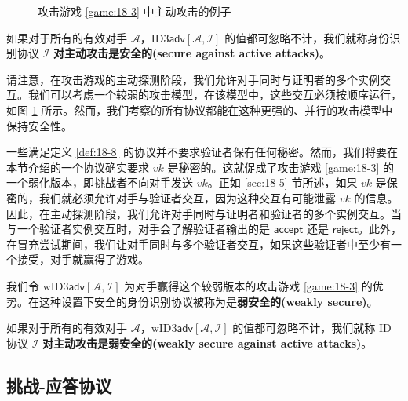 \begin{figure}
  \centering
  
  \caption{攻击游戏 \ref{game:18-3} 中主动攻击的例子}
  \label{fig:18-10}
\end{figure}

\begin{definition}\label{def:18-8}
如果对于所有的有效对手 $\mathcal{A}$，$\mathrm{ID3}\mathsf{adv}[\mathcal{A}, \mathcal{I}]$ 的值都可忽略不计，我们就称身份识别协议 $\mathcal{I}$ \textbf{对主动攻击是安全的(secure against active attacks)}。
\end{definition}

\begin{snote}
请注意，在攻击游戏的主动探测阶段，我们允许对手同时与证明者的多个实例交互。我们可以考虑一个较弱的攻击模型，在该模型中，这些交互必须按顺序运行，如图 \ref{fig:18-10} 所示。然而，我们考察的所有协议都能在这种更强的、并行的攻击模型中保持安全性。
\end{snote}

\begin{snote}[保持 $vk$ 的机密性。]
一些满足定义 \ref{def:18-8} 的协议并不要求验证者保有任何秘密。然而，我们将要在本节介绍的一个协议确实要求 $vk$ 是秘密的。这就促成了攻击游戏 \ref{game:18-3} 的一个弱化版本，即挑战者不向对手发送 $vk$。正如 \ref{sec:18-5} 节所述，如果 $vk$ 是保密的，我们就必须允许对手与验证者交互，因为这种交互有可能泄露 $vk$ 的信息。因此，在主动探测阶段，我们允许对手同时与证明者和验证者的多个实例交互。当与一个验证者实例交互时，对手会了解验证者输出的是 $\mathsf{accept}$ 还是 $\mathsf{reject}$。此外，在冒充尝试期间，我们让对手同时与多个验证者交互，如果这些验证者中至少有一个接受，对手就赢得了游戏。

我们令 $\mathrm{wID3}\mathsf{adv}[\mathcal{A},\mathcal{I}]$ 为对手赢得这个较弱版本的攻击游戏 \ref{game:18-3} 的优势。在这种设置下安全的身份识别协议被称为是\textbf{弱安全的(weakly secure)}。
\end{snote}

\begin{definition}\label{def:18-9}
如果对于所有的有效对手 $\mathcal{A}$，$\mathrm{wID3}\mathsf{adv}[\mathcal{A},\mathcal{I}]$ 的值都可忽略不计，我们就称 ID 协议 $\mathcal{I}$ \textbf{对主动攻击是弱安全的(weakly secure against active attacks)}。
\end{definition}

\subsection{挑战-应答协议}\label{subsec:18-6-1}

